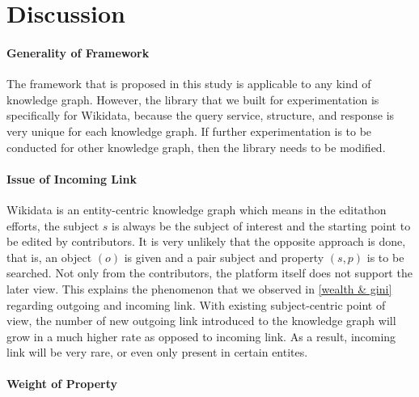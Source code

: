 \section{Discussion}

\paragraph{Generality of Framework}
The framework that is proposed in this study is applicable to any kind of knowledge graph. However, the library that we built for experimentation is specifically for Wikidata, because the query service, structure, and response is very unique for each knowledge graph. If further experimentation is to be conducted for other knowledge graph, then the library needs to be modified.

\paragraph{Issue of Incoming Link}
Wikidata is an entity-centric knowledge graph which means in the editathon efforts, the subject \(s\) is always be the subject of interest and the starting point to be edited by contributors. It is very unlikely that the opposite approach is done, that is, an object \((o)\) is given and a pair subject and property \((s, p)\) is to be searched. Not only from the contributors, the platform itself does not support the later view. This explains the phenomenon that we observed in \autoref{wealth & gini} regarding outgoing and incoming link. With existing subject-centric point of view, the number of new outgoing link introduced to the knowledge graph will grow in a much higher rate as opposed to incoming link. As a result, incoming link will be very rare, or even only present in certain entites.

\paragraph{Weight of Property}


